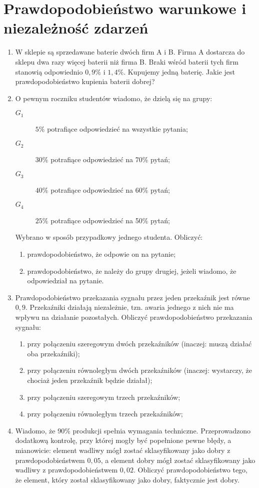 \documentclass{mwart}
\newcommand{\ans}[1]{}
\newcommand{\ans}[1]{\emph{Odpowiedź:} #1}
\begin{document}
\section{Prawdopodobieństwo warunkowe i niezależność zdarzeń}
\begin{enumerate}
\item W sklepie są sprzedawane baterie dwóch firm A i B. Firma A dostarcza do sklepu dwa razy więcej baterii niż firma B. Braki wśród baterii tych firm stanowią odpowiednio $0{,}9\%$ i $1{,}4\%$. Kupujemy jedną baterię. Jakie jest prawdopodobieństwo kupienia baterii dobrej?
\item O pewnym roczniku studentów wiadomo, że dzielą się na grupy:
\begin{description}
\item[$G_1$] $5\%$ potrafiące odpowiedzieć na wszystkie pytania;
\item[$G_2$] $30\%$ potrafiące odpowiedzieć na 70\% pytań;
\item[$G_3$] $40\%$ potrafiące odpowiedzieć na 60\% pytań;
\item[$G_4$] $25\%$ potrafiące odpowiedzieć na 50\% pytań;
\end{description}
Wybrano w sposób przypadkowy jednego studenta. Obliczyć:
\begin{enumerate}
\item prawdopodobieństwo, że odpowie on na pytanie; \ans{$P(O)=\sum P(O|G_i)P(G_i)=0{,}625$}
\item prawdopodobieństwo, że należy do grupy drugiej, jeżeli wiadomo, że odpowiedział na pytanie. \ans{$P(G_2|O)=\frac{P(O|G_2)|P(G_2)}{P(O)}=0{,}336$}
\end{enumerate}
\item Prawdopodobieństwo przekazania sygnału przez jeden przekaźnik jest równe $0{,}9$. Przekaźniki działają niezależnie, tzn. awaria jednego z nich nie ma wpływu na działanie pozostałych.
Obliczyć prawdopodobieństwo przekazania sygnału:
\begin{enumerate}
\item przy połączeniu szeregowym dwóch przekaźników (inaczej: muszą działać oba przekaźniki);
\item przy połączeniu równoległym dwóch przekaźników (inaczej: wystarczy, że chociaż jeden przekaźnik będzie działał);
\item przy połączeniu szeregowym trzech przekaźników;
\item przy połączeniu równoległym trzech przekaźników;
\end{enumerate}
\item Wiadomo, że 90\% produkcji spełnia wymagania techniczne. Przeprowadzono dodatkową kontrolę, przy której mogły być popełnione pewne błędy, a mianowicie: element wadliwy mógł zostać sklasyfikowany jako dobry z prawdopodobieństwem $0{,}05$, a element dobry mógł zostać sklasyfikowany jako wadliwy z prawdopodobieństwem $0{,}02$. Obliczyć prawdopodobieństwo tego, że element, który został sklasyfikowany jako dobry, faktycznie jest dobry. \ans{$P(S|K)=\frac{P(K|S)P(S)}{P(K)}=\frac{(1-P(K'|S))P(S)}{(1-P(K'|S))P(S)+P(K|S')P(S')}=\frac{(1-0{,}02)0{,}9}{(1-0{,}02)0{,}9+0{,}05\cdot0{,}1}\approx0{,}994$}



\end{enumerate}
\end{document}
